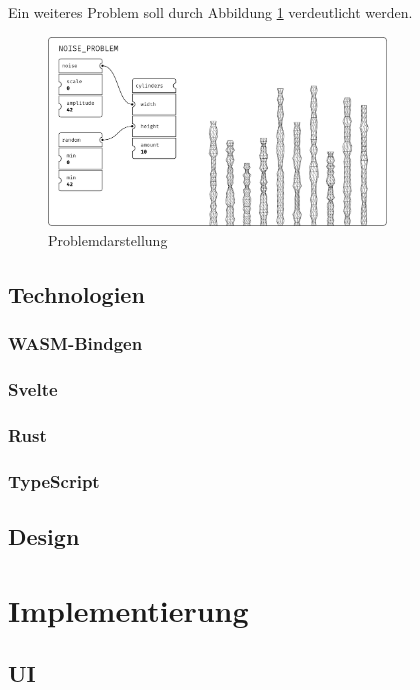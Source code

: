 \documentclass[ngerman]{article}
\begin{document}
\pagebreak

Ein weiteres Problem soll durch Abbildung \ref{fig:noise_problem} verdeutlicht werden.

\begin{figure}[htbp]
  \centering
  \includegraphics[width=0.8\textwidth]{./graphics/NOISE_PROBLEM.pdf}
  \caption{Problemdarstellung}
  \label{fig:noise_problem}
\end{figure}

\subsection{Technologien}
\subsubsection{WASM-Bindgen}
\label{sec:WASM-Bindgen}
\subsubsection{Svelte}
\label{sec:Svelte}
\subsubsection{Rust}
\label{sec:Rust}
\subsubsection{TypeScript}
\label{sec:TypeScript}
\subsection{Design}

\section{Implementierung}
\subsection{UI}
\end{document}
